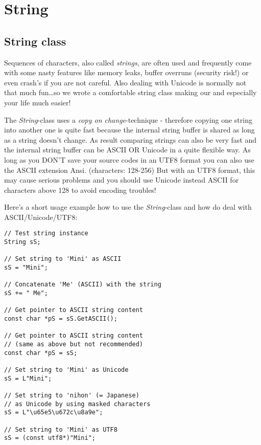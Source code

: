 \chapter{String}




\section{String class}
Sequences of characters, also called \emph{strings}, are often used and frequently come with some nasty features like memory leaks, buffer overruns (security risk!) or even crash's if you are not careful. Also dealing with Unicode is normally not that much fun\ldots so we wrote a comfortable string class making our and especially your life much easier!

The \emph{String}-class uses a \emph{copy on change}-technique - therefore copying one string into another one is quite fast because the internal string buffer is shared as long as a string doesn't change. As result comparing strings can also be very fast and the internal string buffer can be ASCII OR Unicode in a quite flexible way. As long as you DON'T save your source codes in an UTF8 format you can also use the ASCII extension Ansi. (characters: 128-256) But with an UTF8 format, this may cause serious problems and you should use Unicode instead ASCII for characters above 128 to avoid encoding troubles!

Here's a short usage example how to use the \emph{String}-class and how do deal with ASCII/Unicode/UTF8:

\begin{lstlisting}[caption=ASCII/Unicode/UTF8 string example]
// Test string instance
String sS;

// Set string to 'Mini' as ASCII
sS = "Mini";

// Concatenate 'Me' (ASCII) with the string
sS += " Me";

// Get pointer to ASCII string content
const char *pS = sS.GetASCII();

// Get pointer to ASCII string content
// (same as above but not recommended)
const char *pS = sS;

// Set string to 'Mini' as Unicode
sS = L"Mini";

// Set string to 'nihon' (= Japanese)
// as Unicode by using masked characters
sS = L"\u65e5\u672c\u8a9e";

// Set string to 'Mini' as UTF8
sS = (const utf8*)"Mini";
\end{lstlisting}

